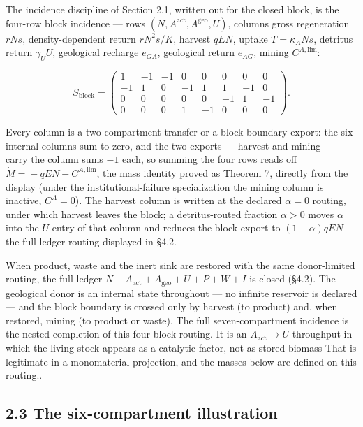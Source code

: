 \documentclass[11pt]{article}
\begin{document}
The incidence discipline of Section 2.1, written out for the closed block, is the four-row block incidence --- rows \((N,\allowbreak{} A^{\mathrm{act}},\allowbreak{} A^{\mathrm{geo}},\allowbreak{} U)\), columns gross regeneration \(rNs\), density-dependent return \(rN^2 s/\allowbreak{}K\), harvest \(qEN\), uptake \(T = \kappa_A N s\), detritus return \(\gamma_U U\), geological recharge \(e_{GA}\), geological return \(e_{AG}\), mining \(C^{A,\mathrm{lim}}\): 

$$S_{\mathrm{block}} = \begin{pmatrix} 1 & -1 & -1 & 0 & 0 & 0 & 0 & 0 \\ -1 & 1 & 0 & -1 & 1 & 1 & -1 & 0 \\ 0 & 0 & 0 & 0 & 0 & -1 & 1 & -1 \\ 0 & 0 & 0 & 1 & -1 & 0 & 0 & 0 \end{pmatrix}.$$

 Every column is a two-compartment transfer or a block-boundary export: the six internal columns sum to zero, and the two exports --- harvest and mining --- carry the column sums \(-1\) each, so summing the four rows reads off \(\dot M =\allowbreak{} -qEN - C^{A,\allowbreak{}\mathrm{lim}}\), the mass identity proved as Theorem 7, directly from the display (under the institutional-failure specialization the mining column is inactive, \(C^A = 0\)). The harvest column is written at the declared \(\alpha=0\) routing, under which harvest leaves the block; a detritus-routed fraction \(\alpha>0\) moves \(\alpha\) into the \(U\) entry of that column and reduces the block export to \((1-\alpha)qEN\) --- the full-ledger routing displayed in \S4.2.

When product, waste and the inert sink are restored with the same donor-limited routing, the full ledger \(N+\allowbreak{}A_{\mathrm{act}}+\allowbreak{}A_{\mathrm{geo}}+\allowbreak{}U+\allowbreak{}P+\allowbreak{}W+\allowbreak{}I\) is closed (\S4.2). The geological donor is an internal state throughout --- no infinite reservoir is declared --- and the block boundary is crossed only by harvest (to product) and, when restored, mining (to product or waste). The full seven-compartment incidence is the nested completion of this four-block routing. It is an \(A_{\mathrm{act}}\to U\) throughput in which the living stock appears as a catalytic factor, not as stored biomass That is legitimate in a monomaterial projection, and the masses below are defined on this routing..

\subsection*{2.3 The six-compartment illustration}\label{23-the-six-compartment-illustration}
\end{document}
